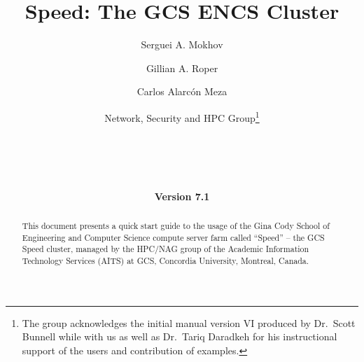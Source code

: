 \documentclass{easychair}
\begin{document}
%
\title{Speed: The GCS ENCS Cluster}

%

\date{\textbf{Version 7.1}}

%
\author{
    Serguei A. Mokhov
\and
    Gillian A. Roper
\and
    Carlos Alarcón Meza
\and
    Network, Security and HPC Group\footnote{The group acknowledges the initial manual version VI produced by Dr.~Scott Bunnell while with us
		as well as Dr.~Tariq Daradkeh for his instructional support of the users and contribution of examples.}\\
    \\
    \\
    \\
    \\
}

%

\maketitle

\begin{abstract}
This document presents a quick start guide to the usage of the Gina Cody School 
of Engineering and Computer Science compute server farm called ``Speed'' -- the 
GCS Speed cluster, managed by the HPC/NAG group of the Academic Information 
Technology Services (AITS) at GCS, Concordia University, Montreal, Canada.
\end{abstract}
\end{document}
